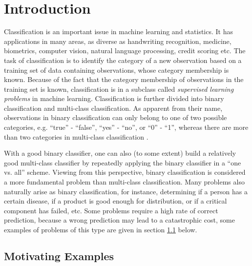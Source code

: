 \section{Introduction}
\label{cha:intro}

Classification is an important issue in machine learning and statistics. It has applications in many areas, as diverse as handwriting recognition, medicine, biometrics, computer vision, natural language processing, credit scoring etc. The task of classification is to identify the category of a new observation based on a training set of data containing observations, whose category membership is known. Because of the fact that the category membership of observations in the training set is known, classification is in a subclass called \emph{supervised learning problems} in machine learning. Classification is further divided into binary classification and multi-class classification. As apparent from their name, observations in binary classification can only belong to one of two possible categories, e.g. ``true'' - ``false'', ``yes'' - ``no'', or ``0'' - ``1'', whereas there are more than two categories in multi-class classification .

With a good binary classifier, one can also (to some extent) build a relatively good multi-class classifier by repeatedly applying the binary classifier in a ``one vs. all'' scheme. Viewing from this perspective, binary classification is considered a more fundamental problem than multi-class classification. Many problems also naturally arise as binary classification, for instance, determining if a person has a certain disease, if a product is good enough for distribution, or if a critical component has failed, etc. Some problems require a high rate of correct prediction, because a wrong prediction may lead to a catastrophic cost, some examples of problems of this type are given in section \ref{sec:intro.motivation} below. 


\subsection{Motivating Examples}
\label{sec:intro.motivation}

